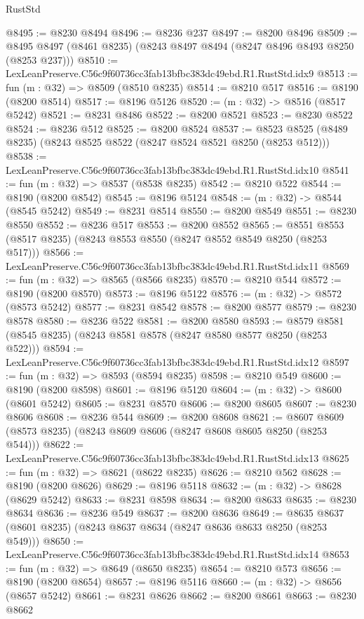 \begin{lexlean}{RustStd}
\begin{coremodule}
@8495 := @8230 @8494
@8496 := @8236 @237
@8497 := @8200 @8496
@8509 := @8495 @8497 (@8461 @8235) (@8243 @8497 @8494 (@8247 @8496 @8493 @8250 (@8253 @237)))
@8510 := LexLeanPreserve.C56c9f60736cc3fab13bfbc383dc49ebd.R1.RustStd.idx9
@8513 := fun (m : @32) => @8509 (@8510 @8235)
@8514 := @8210 @517
@8516 := @8190 (@8200 @8514)
@8517 := @8196 @5126
@8520 := (m : @32) -> @8516 (@8517 @5242)
@8521 := @8231 @8486
@8522 := @8200 @8521
@8523 := @8230 @8522
@8524 := @8236 @512
@8525 := @8200 @8524
@8537 := @8523 @8525 (@8489 @8235) (@8243 @8525 @8522 (@8247 @8524 @8521 @8250 (@8253 @512)))
@8538 := LexLeanPreserve.C56c9f60736cc3fab13bfbc383dc49ebd.R1.RustStd.idx10
@8541 := fun (m : @32) => @8537 (@8538 @8235)
@8542 := @8210 @522
@8544 := @8190 (@8200 @8542)
@8545 := @8196 @5124
@8548 := (m : @32) -> @8544 (@8545 @5242)
@8549 := @8231 @8514
@8550 := @8200 @8549
@8551 := @8230 @8550
@8552 := @8236 @517
@8553 := @8200 @8552
@8565 := @8551 @8553 (@8517 @8235) (@8243 @8553 @8550 (@8247 @8552 @8549 @8250 (@8253 @517)))
@8566 := LexLeanPreserve.C56c9f60736cc3fab13bfbc383dc49ebd.R1.RustStd.idx11
@8569 := fun (m : @32) => @8565 (@8566 @8235)
@8570 := @8210 @544
@8572 := @8190 (@8200 @8570)
@8573 := @8196 @5122
@8576 := (m : @32) -> @8572 (@8573 @5242)
@8577 := @8231 @8542
@8578 := @8200 @8577
@8579 := @8230 @8578
@8580 := @8236 @522
@8581 := @8200 @8580
@8593 := @8579 @8581 (@8545 @8235) (@8243 @8581 @8578 (@8247 @8580 @8577 @8250 (@8253 @522)))
@8594 := LexLeanPreserve.C56c9f60736cc3fab13bfbc383dc49ebd.R1.RustStd.idx12
@8597 := fun (m : @32) => @8593 (@8594 @8235)
@8598 := @8210 @549
@8600 := @8190 (@8200 @8598)
@8601 := @8196 @5120
@8604 := (m : @32) -> @8600 (@8601 @5242)
@8605 := @8231 @8570
@8606 := @8200 @8605
@8607 := @8230 @8606
@8608 := @8236 @544
@8609 := @8200 @8608
@8621 := @8607 @8609 (@8573 @8235) (@8243 @8609 @8606 (@8247 @8608 @8605 @8250 (@8253 @544)))
@8622 := LexLeanPreserve.C56c9f60736cc3fab13bfbc383dc49ebd.R1.RustStd.idx13
@8625 := fun (m : @32) => @8621 (@8622 @8235)
@8626 := @8210 @562
@8628 := @8190 (@8200 @8626)
@8629 := @8196 @5118
@8632 := (m : @32) -> @8628 (@8629 @5242)
@8633 := @8231 @8598
@8634 := @8200 @8633
@8635 := @8230 @8634
@8636 := @8236 @549
@8637 := @8200 @8636
@8649 := @8635 @8637 (@8601 @8235) (@8243 @8637 @8634 (@8247 @8636 @8633 @8250 (@8253 @549)))
@8650 := LexLeanPreserve.C56c9f60736cc3fab13bfbc383dc49ebd.R1.RustStd.idx14
@8653 := fun (m : @32) => @8649 (@8650 @8235)
@8654 := @8210 @573
@8656 := @8190 (@8200 @8654)
@8657 := @8196 @5116
@8660 := (m : @32) -> @8656 (@8657 @5242)
@8661 := @8231 @8626
@8662 := @8200 @8661
@8663 := @8230 @8662

\end{coremodule}
\end{lexlean}
